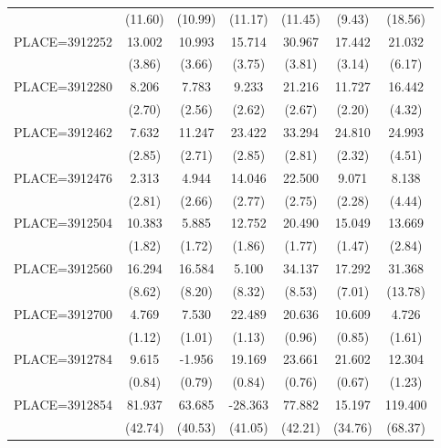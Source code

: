 {\begin{tabular}{l*{6}{c}}
                    &     (11.60)&     (10.99)&     (11.17)&     (11.45)&      (9.43)&     (18.56)\\
PLACE=3912252       &      13.002&      10.993&      15.714&      30.967&      17.442&      21.032\\
                    &      (3.86)&      (3.66)&      (3.75)&      (3.81)&      (3.14)&      (6.17)\\
PLACE=3912280       &       8.206&       7.783&       9.233&      21.216&      11.727&      16.442\\
                    &      (2.70)&      (2.56)&      (2.62)&      (2.67)&      (2.20)&      (4.32)\\
PLACE=3912462       &       7.632&      11.247&      23.422&      33.294&      24.810&      24.993\\
                    &      (2.85)&      (2.71)&      (2.85)&      (2.81)&      (2.32)&      (4.51)\\
PLACE=3912476       &       2.313&       4.944&      14.046&      22.500&       9.071&       8.138\\
                    &      (2.81)&      (2.66)&      (2.77)&      (2.75)&      (2.28)&      (4.44)\\
PLACE=3912504       &      10.383&       5.885&      12.752&      20.490&      15.049&      13.669\\
                    &      (1.82)&      (1.72)&      (1.86)&      (1.77)&      (1.47)&      (2.84)\\
PLACE=3912560       &      16.294&      16.584&       5.100&      34.137&      17.292&      31.368\\
                    &      (8.62)&      (8.20)&      (8.32)&      (8.53)&      (7.01)&     (13.78)\\
PLACE=3912700       &       4.769&       7.530&      22.489&      20.636&      10.609&       4.726\\
                    &      (1.12)&      (1.01)&      (1.13)&      (0.96)&      (0.85)&      (1.61)\\
PLACE=3912784       &       9.615&      -1.956&      19.169&      23.661&      21.602&      12.304\\
                    &      (0.84)&      (0.79)&      (0.84)&      (0.76)&      (0.67)&      (1.23)\\
PLACE=3912854       &      81.937&      63.685&     -28.363&      77.882&      15.197&     119.400\\
                    &     (42.74)&     (40.53)&     (41.05)&     (42.21)&     (34.76)&     (68.37)\\

\end{tabular}}
